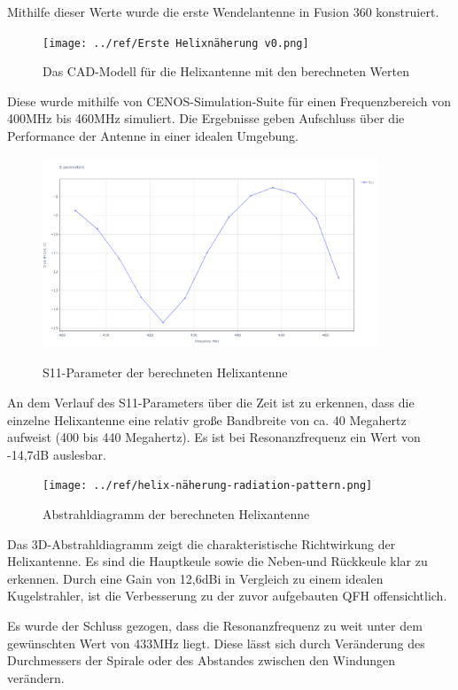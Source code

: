 Mithilfe dieser Werte wurde die erste Wendelantenne in Fusion 360 konstruiert. 

\begin{figure}[h!]
	\centering
	\texttt{[image: ../ref/Erste Helixnäherung v0.png]}
	\label{fig:ersteHelixnäherung}
	\caption{Das CAD-Modell für die Helixantenne mit den berechneten Werten}
\end{figure}

Diese wurde mithilfe von CENOS-Simulation-Suite für einen Frequenzbereich von 400MHz bis 460MHz simuliert. Die Ergebnisse geben Aufschluss über die Performance der Antenne in einer idealen Umgebung.

\begin{figure}[H]
	\centering
	\includegraphics[width=10cm]{../ref/helix-naherung-S11.png}
	\label{fig:ersteHelixnäherung-S11}
	\caption{S11-Parameter der berechneten Helixantenne}
\end{figure}

An dem Verlauf des S11-Parameters über die Zeit ist zu erkennen, dass die einzelne Helixantenne eine relativ große Bandbreite von ca. 40 Megahertz aufweist (400 bis 440 Megahertz). Es ist bei Resonanzfrequenz ein Wert von -14,7dB auslesbar. 

\begin{figure}[H]
	\centering
	\texttt{[image: ../ref/helix-näherung-radiation-pattern.png]}
	\label{fig:ersteHelixnäherung-abstrahldiagramm}
	\caption{Abstrahldiagramm der berechneten Helixantenne}
\end{figure}

Das 3D-Abstrahldiagramm zeigt die charakteristische Richtwirkung der Helixantenne. Es sind die Hauptkeule sowie die Neben-und Rückkeule klar zu erkennen. Durch eine Gain von 12,6dBi in Vergleich zu einem idealen Kugelstrahler, ist die Verbesserung zu der zuvor aufgebauten QFH offensichtlich.

Es wurde der Schluss gezogen, dass die Resonanzfrequenz zu weit unter dem gewünschten Wert von 433MHz liegt. Diese lässt sich durch Veränderung des Durchmessers der Spirale oder des Abstandes zwischen den Windungen verändern.

